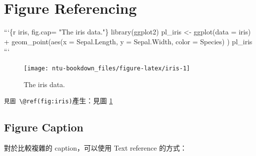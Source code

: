 \documentclass[oneside]{book}
\newenvironment{Shaded}{\begin{snugshade}}{\end{snugshade}}
\newcommand{\BaseNTok}[1]{\textcolor[rgb]{0.00,0.00,0.81}{#1}}
\newcommand{\NormalTok}[1]{#1}
\theoremstyle{definition}
\theoremstyle{definition}
\theoremstyle{definition}
\theoremstyle{remark}
\begin{document}
\hypertarget{figure-referencing}{%
\section{Figure Referencing}\label{figure-referencing}}

\begin{Shaded}
\begin{Highlighting}[]
\BaseNTok{```\{r iris, fig.cap= "The iris data."\}}
\BaseNTok{library(ggplot2)}
\BaseNTok{pl_iris <- ggplot(data = iris) +}
\BaseNTok{             geom_point(aes(x = Sepal.Length,}
\BaseNTok{                            y = Sepal.Width,}
\BaseNTok{                            color = Species)}
\BaseNTok{                        )}
\BaseNTok{pl_iris}
\BaseNTok{```}
\end{Highlighting}
\end{Shaded}

\begin{figure}

{\centering \texttt{[image: ntu-bookdown\_files/figure-latex/iris-1]} 

}

\caption{The iris data.}\label{fig:iris}
\end{figure}

\texttt{見圖\ \textbackslash{}@ref(fig:iris)}產生：見圖 \ref{fig:iris}

\hypertarget{figure-caption}{%
\subsection{Figure Caption}\label{figure-caption}}

對於比較複雜的 caption，可以使用 Text reference 的方式：

\begin{Shaded}
\end{Shaded}
\end{document}

